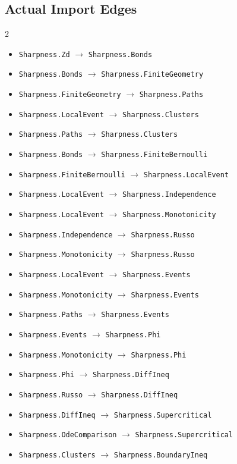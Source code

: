 \documentclass[10pt]{article}
\newcommand{\module}[1]{\texttt{#1}}
\begin{document}
\subsection*{Actual Import Edges}
\begin{multicols}{2}
\begin{itemize}
\item \module{Sharpness.Zd} \(\to\) \module{Sharpness.Bonds}
\item \module{Sharpness.Bonds} \(\to\) \module{Sharpness.FiniteGeometry}
\item \module{Sharpness.FiniteGeometry} \(\to\) \module{Sharpness.Paths}
\item \module{Sharpness.LocalEvent} \(\to\) \module{Sharpness.Clusters}
\item \module{Sharpness.Paths} \(\to\) \module{Sharpness.Clusters}
\item \module{Sharpness.Bonds} \(\to\) \module{Sharpness.FiniteBernoulli}
\item \module{Sharpness.FiniteBernoulli} \(\to\) \module{Sharpness.LocalEvent}
\item \module{Sharpness.LocalEvent} \(\to\) \module{Sharpness.Independence}
\item \module{Sharpness.LocalEvent} \(\to\) \module{Sharpness.Monotonicity}
\item \module{Sharpness.Independence} \(\to\) \module{Sharpness.Russo}
\item \module{Sharpness.Monotonicity} \(\to\) \module{Sharpness.Russo}
\item \module{Sharpness.LocalEvent} \(\to\) \module{Sharpness.Events}
\item \module{Sharpness.Monotonicity} \(\to\) \module{Sharpness.Events}
\item \module{Sharpness.Paths} \(\to\) \module{Sharpness.Events}
\item \module{Sharpness.Events} \(\to\) \module{Sharpness.Phi}
\item \module{Sharpness.Monotonicity} \(\to\) \module{Sharpness.Phi}
\item \module{Sharpness.Phi} \(\to\) \module{Sharpness.DiffIneq}
\item \module{Sharpness.Russo} \(\to\) \module{Sharpness.DiffIneq}
\item \module{Sharpness.DiffIneq} \(\to\) \module{Sharpness.Supercritical}
\item \module{Sharpness.OdeComparison} \(\to\) \module{Sharpness.Supercritical}
\item \module{Sharpness.Clusters} \(\to\) \module{Sharpness.BoundaryIneq}

\end{itemize}
\end{multicols}
\end{document}
